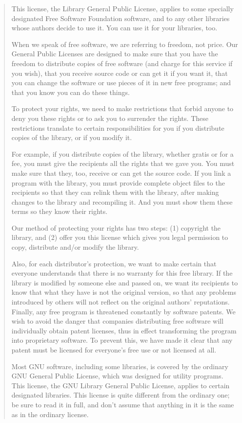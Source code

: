 \documentclass[
]{book}
\theoremstyle{definition}
\theoremstyle{definition}
\theoremstyle{definition}
\theoremstyle{definition}
\theoremstyle{remark}
\begin{document}
\begin{quote}
This license, the Library General Public License, applies to
some specially designated Free Software Foundation software, and
to any other libraries whose authors decide to use it. You can
use it for your libraries, too.

When we speak of free software, we are referring to freedom, not
price. Our General Public Licenses are designed to make sure
that you have the freedom to distribute copies of free software
(and charge for this service if you wish), that you receive
source code or can get it if you want it, that you can change
the software or use pieces of it in new free programs; and that
you know you can do these things.

To protect your rights, we need to make restrictions that forbid
anyone to deny you these rights or to ask you to surrender the
rights. These restrictions translate to certain responsibilities
for you if you distribute copies of the library, or if you
modify it.

For example, if you distribute copies of the library, whether
gratis or for a fee, you must give the recipients all the rights
that we gave you. You must make sure that they, too, receive or
can get the source code. If you link a program with the
library, you must provide complete object files to the
recipients so that they can relink them with the library, after
making changes to the library and recompiling it. And you must
show them these terms so they know their rights.

Our method of protecting your rights has two steps: (1)
copyright the library, and (2) offer you this license which
gives you legal permission to copy, distribute and/or modify the
library.

Also, for each distributor's protection, we want to make certain
that everyone understands that there is no warranty for this
free library. If the library is modified by someone else and
passed on, we want its recipients to know that what they have is
not the original version, so that any problems introduced by
others will not reflect on the original authors' reputations.
Finally, any free program is threatened constantly by software
patents. We wish to avoid the danger that companies
distributing free software will individually obtain patent
licenses, thus in effect transforming the program into
proprietary software. To prevent this, we have made it clear
that any patent must be licensed for everyone's free use or not
licensed at all.

Most GNU software, including some libraries, is covered by the
ordinary GNU General Public License, which was designed for
utility programs. This license, the GNU Library General Public
License, applies to certain designated libraries. This license
is quite different from the ordinary one; be sure to read it in
full, and don't assume that anything in it is the same as in the
ordinary license.


\end{quote}
\end{document}
